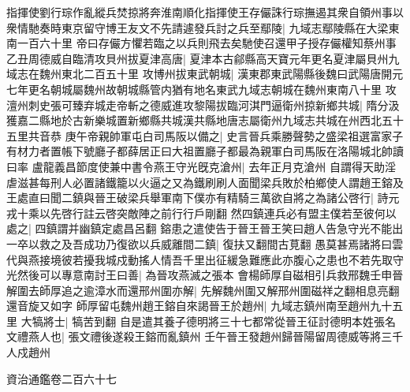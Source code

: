 指揮使劉行琮作亂縱兵焚掠將奔淮南順化指揮使王存儼誅行琮撫遏其衆自領州事以衆情馳奏時東京留守博王友文不先請遽發兵討之兵至鄢陵|{
	九域志鄢陵縣在大梁東南一百六十里}
帝曰存儼方懼若臨之以兵則飛去矣馳使召還甲子授存儼權知蔡州事　乙丑周德威自臨清攻貝州拔夏津高唐|{
	夏津本古鄃縣高天寶元年更名夏津屬貝州九域志在魏州東北二百五十里}
攻博州拔東武朝城|{
	漢東郡東武陽縣後魏曰武陽唐開元七年更名朝城屬魏州故朝城縣管内猶有地名東武九域志朝城在魏州東南八十里}
攻澶州刺史張可臻弃城走帝斬之德威進攻黎陽拔臨河淇門逼衛州掠新鄉共城|{
	隋分汲獲嘉二縣地於古新樂城置新鄉縣共城漢共縣地唐志屬衛州九域志共城在州西北五十五里共音恭}
庚午帝親帥軍屯白司馬阪以備之|{
	史言晉兵乘勝聲勢之盛梁祖選富家子有材力者置帳下號廳子都薛居正曰大祖置廳子都最為親軍白司馬阪在洛陽城北帥讀曰率}
盧龍義昌節度使兼中書令燕王守光旣克滄州|{
	去年正月克滄州}
自謂得天助淫虐滋甚每刑人必置諸鐵籠以火逼之又為鐵刷刷人面聞梁兵敗於柏鄉使人謂趙王鎔及王處直曰聞二鎮與晉王破梁兵舉軍南下僕亦有精騎三萬欲自將之為諸公啓行|{
	詩元戎十乘以先啓行註云啓突敵陣之前行行戶剛翻}
然四鎮連兵必有盟主僕若至彼何以處之|{
	四鎮謂并幽鎮定處昌呂翻}
鎔患之遣使告于晉王晉王笑曰趙人告急守光不能出一卒以救之及吾成功乃復欲以兵威離間二鎮|{
	復扶又翻間古莧翻}
愚莫甚焉諸將曰雲代與燕接境彼若擾我城戍動搖人情吾千里出征緩急難應此亦腹心之患也不若先取守光然後可以專意南討王曰善|{
	為晉攻燕滅之張本}
會楊師厚自磁相引兵救邢魏壬申晉解圍去師厚追之逾漳水而還邢州圍亦解|{
	先解魏州圍又解邢州圍磁祥之翻相息亮翻還音旋又如字}
師厚留屯魏州趙王鎔自來謁晉王於趙州|{
	九域志鎮州南至趙州九十五里}
大犒將士|{
	犒苦到翻}
自是遣其養子德明將三十七都常從晉王征討德明本姓張名文禮燕人也|{
	張文禮後遂殺王鎔而亂鎮州}
壬午晉王發趙州歸晉陽留周德威等將三千人戍趙州

資治通鑑卷二百六十七
